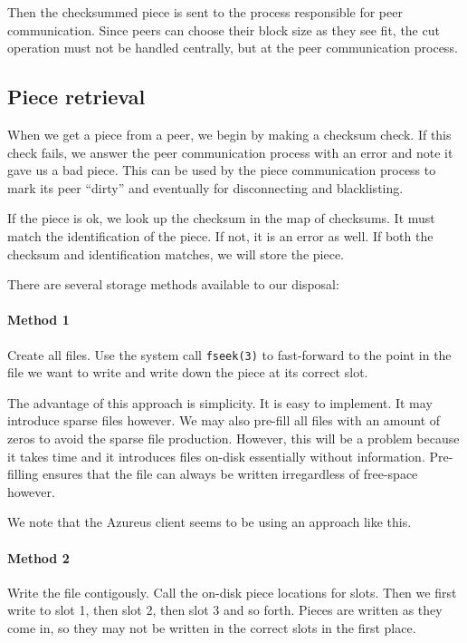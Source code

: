 \documentclass[a4paper]{memoir}
\begin{document}
Then the checksummed piece is sent to the process responsible for peer
communication. Since peers can choose their block size as they see
fit, the cut operation must not be handled centrally, but at the peer
communication process.

\subsection{Piece retrieval}

When we get a piece from a peer, we begin by making a checksum
check. If this check fails, we answer the peer communication process
with an error and note it gave us a bad piece. This can be used by the
piece communication process to mark its peer ``dirty'' and eventually
for disconnecting and blacklisting.

If the piece is ok, we look up the checksum in the map of
checksums. It must match the identification of the piece. If not, it
is an error as well. If both the checksum and identification matches,
we will store the piece.

There are several storage methods available to our disposal:

\paragraph{Method 1}
Create all files. Use the system call \texttt{fseek(3)} to
fast-forward to the point in the file we want to write and write down
the piece at its correct slot.

The advantage of this approach is simplicity. It is easy to
implement. It may introduce sparse files however. We may also pre-fill
all files with an amount of zeros to avoid the sparse file
production. However, this will be a problem because it takes time and
it introduces files on-disk essentially without
information. Pre-filling ensures that the file can always be written
irregardless of free-space however.

We note that the Azureus client seems to be using an approach like
this.

\paragraph{Method 2}
Write the file contigously. Call the on-disk piece locations for
slots. Then we first write to slot 1, then slot 2, then slot 3 and so
forth. Pieces are written as they come in, so they may not be written
in the correct slots in the first place.
\end{document}

